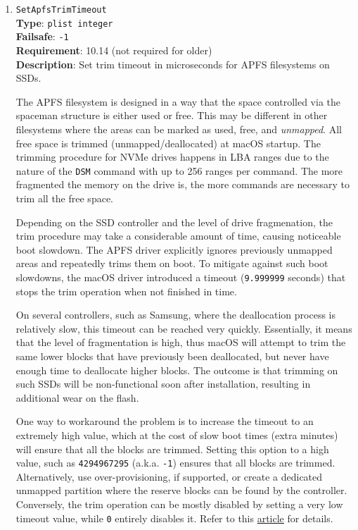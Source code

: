 \documentclass[]{article}
\begin{document}
\begin{enumerate}
\item
  \texttt{SetApfsTrimTimeout}\\
  \textbf{Type}: \texttt{plist\ integer}\\
  \textbf{Failsafe}: \texttt{-1}\\
  \textbf{Requirement}: 10.14 (not required for older)\\
  \textbf{Description}: Set trim timeout in microseconds for APFS filesystems on SSDs.

  The APFS filesystem is designed in a way that the space controlled via
  the spaceman structure is either used or free. This may be different in
  other filesystems where the areas can be marked as used, free, and
  \emph{unmapped}. All free space is trimmed (unmapped/deallocated)
  at macOS startup. The trimming procedure for NVMe drives happens
  in LBA ranges due to the nature of the \texttt{DSM} command with
  up to 256 ranges per command. The more fragmented the memory
  on the drive is, the more commands are necessary to trim
  all the free space.

  Depending on the SSD controller and the level of drive fragmenation, the trim
  procedure may take a considerable amount of time, causing noticeable boot slowdown.
  The APFS driver explicitly ignores previously unmapped areas and repeatedly trims
  them on boot. To mitigate against such boot slowdowns, the macOS driver introduced a
  timeout (\texttt{9.999999} seconds) that stops the trim operation when not finished in
  time.

  On several controllers, such as Samsung, where the deallocation process is relatively slow,
  this timeout can be reached very quickly. Essentially, it means that the level of
  fragmentation is high, thus macOS will attempt to trim the same lower blocks that
  have previously been deallocated, but never have enough time to deallocate higher
  blocks. The outcome is that trimming on such SSDs will be non-functional soon
  after installation, resulting in additional wear on the flash.

  One way to workaround the problem is to increase the timeout to an extremely
  high value, which at the cost of slow boot times (extra minutes) will
  ensure that all the blocks are trimmed. Setting this option to a high value,
  such as \texttt{4294967295} (a.k.a. \texttt{-1}) ensures that all blocks are trimmed.
  Alternatively, use over-provisioning, if supported, or create
  a dedicated unmapped partition where the reserve blocks can be found
  by the controller. Conversely, the trim operation can be mostly disabled by
  setting a very low timeout value, while \texttt{0} entirely disables it. Refer to this
  \href{https://interface31.ru/tech_it/2015/04/mozhno-li-effektivno-ispolzovat-ssd-bez-podderzhki-trim.html}{article}
  for details.


\end{enumerate}
\end{document}
